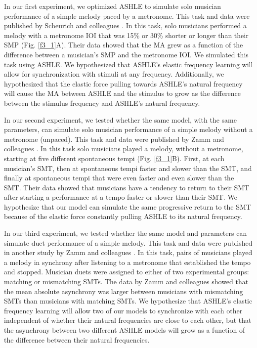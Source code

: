 \documentclass{report}
\begin{document}
In our first experiment, we optimized ASHLE to simulate solo musician performance of a simple melody paced by a metronome. This task and data were published by Scheurich and colleagues \cite{scheurich2018tapping}. In this task, solo musicians performed a melody with a metronome IOI that was 15\% or 30\% shorter or longer than their SMP (Fig.{} \ref{f3_1}A). Their data showed that the MA grew as a function of the difference between a musician's SMP and the metronome IOI. We simulated this task using ASHLE. We hypothesized that ASHLE's elastic frequency learning will allow for synchronization with stimuli at any frequency. Additionally, we hypothesized that the elastic force pulling towards ASHLE's natural frequency will cause the MA between ASHLE and the stimulus to grow as the difference between the stimulus frequency and ASHLE's natural frequency.

In our second experiment, we tested whether the same model, with the same parameters, can simulate solo musician performance of a simple melody without a metronome (unpaced). This task and data were published by Zamm and colleagues \cite{zamm2018musicians}. In this task solo musicians played a melody, without a metronome, starting at five different spontaneous tempi (Fig.{} \ref{f3_1}B). First, at each musician's SMT, then at spontaneous tempi faster and slower than the SMT, and finally at spontaneous tempi that were even faster and even slower than the SMT. Their data showed that musicians have a tendency to return to their SMT after starting a performance at a tempo faster or slower than their SMT. We hypothesize that our model can simulate the same progressive return to the SMT because of the elastic force constantly pulling ASHLE to its natural frequency. 

In our third experiment, we tested whether the same model and parameters can simulate duet performance of a simple melody. This task and data were published in another study by Zamm and colleagues \cite{zamm2016endogenous}. In this task, pairs of musicians played a melody in synchrony after listening to a metronome that established the tempo and stopped. Musician duets were assigned to either of two experimental groups: matching or mismatching SMTs. The data by Zamm and colleagues \cite{zamm2016endogenous} showed that the mean absolute asynchrony was larger between musicians with mismatching SMTs than musicians with matching SMTs. We hypothesize that ASHLE's elastic frequency learning will allow two of our models to synchronize with each other independent of whether their natural frequencies are close to each other, but that the asynchrony between two different ASHLE models will grow as a function of the difference between their natural frequencies.
\end{document}
